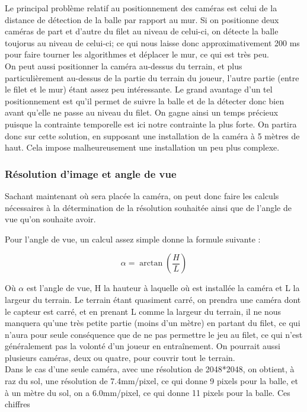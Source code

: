 Le principal problème relatif au positionnement des caméras est celui de la distance de détection de la balle par rapport au mur. Si on positionne deux caméras de part et d'autre du filet au niveau de celui-ci, on détecte la balle toujorus au niveau de celui-ci; ce qui nous laisse donc approximativement 200 ms pour faire tourner les algorithmes et déplacer le mur, ce qui est très peu. \\

On peut aussi positionner la caméra au-dessus du terrain, et plus particulièrement au-dessus de la partie du terrain du joueur, l'autre partie (entre le filet et le mur) étant assez peu intéressante. Le grand avantage d'un tel positionnement est qu'il permet de suivre la balle et de la détecter donc bien avant qu'elle ne passe au niveau du filet. On gagne ainsi un temps précieux puisque la contrainte temporelle est ici notre contrainte la plus forte. On partira donc sur cette solution, en supposant une installation de la caméra à 5 mètres de haut. Cela impose malheureusement une installation un peu plus complexe.


\subsubsection{Résolution d'image et angle de vue}

Sachant maintenant où sera placée la caméra, on peut donc faire les calculs nécessaires à la détermination de la résolution souhaitée ainsi que de l'angle de vue qu'on souhaite avoir.

Pour l'angle de vue, un calcul assez simple donne la formule suivante : 

$$ \alpha = \arctan ( \frac{H}{L}) $$

Où $\alpha$ est l'angle de vue, H la hauteur à laquelle où est installée la caméra et L la largeur du terrain. Le terrain étant quasiment carré, on prendra une caméra dont le capteur est carré, et en prenant L comme la largeur du terrain, il ne nous manquera qu'une très petite partie (moins d'un mètre) en partant du filet, ce qui n'aura pour seule conséquence que de ne pas permettre le jeu au filet, ce qui n'est généralement pas la volonté d'un joueur en entraînement. On pourrait aussi plusieurs caméras, deux ou quatre, pour couvrir tout le terrain. \\ 

Dans le cas d'une seule caméra, avec une résolution de 2048*2048, on obtient, à raz du sol, une résolution de 7.4mm/pixel, ce qui donne 9 pixels pour la balle, et à un mètre du sol, on a 6.0mm/pixel, ce qui donne 11 pixels pour la balle. Ces chiffres



